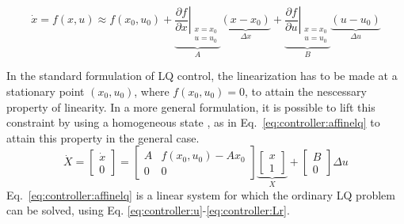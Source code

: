     \begin{equation}
        \label{eq:controller:gainscheduling:xdot}
        \dot{x} = f(x,u) \approx f(x_{0},u_{0})
            + \underbrace{\left. \frac{\partial f}{\partial x} \right|_{
                \begin{array}{l}
                    x=x_{0} \\
                    u=u_{0}
                \end{array}
            }}_{A}
                \underbrace{\left( x-x_{0} \right)}_{\Delta x}
            + \underbrace{\left. \frac{\partial f}{\partial u} \right|_{
                \begin{array}{l}
                    x=x_{0} \\
                    u=u_{0}
                \end{array}
            }}_{B}
                \underbrace{\left( u-u_{0} \right)}_{\Delta u}
    \end{equation}

    In the standard formulation of LQ control, the linearization has to be made
    at a stationary point $(x_{0},u_{0})$, where $f(x_{0},u_{0}) = 0$, to
    attain the nescessary property of linearity.
    In a more general formulation, it is possible to lift this constraint by
    using a homogeneous state \citep{Rantzer99piecewiselinear}, as in Eq.~\ref{eq:controller:affinelq}
    to attain this property in the general case.
    \begin{equation}
    \label{eq:controller:affinelq}
        \dot{X} = \left[
        \begin{array}{c}
            \dot{x} \\
            0
        \end{array}\right] =
        \left[
        \begin{array}{cc}
            A & f(x_{0},u_{0})-Ax_{0} \\
            0 & 0
        \end{array}\right]
        \underbrace{\left[
        \begin{array}{c}
            x \\
            1
        \end{array}\right]}_{X}
        +
        \left[
        \begin{array}{c}
            B \\
            0
        \end{array}\right]
        \Delta u
    \end{equation}
    Eq.~\ref{eq:controller:affinelq} is a linear system for which
    the ordinary LQ problem can be solved, using Eq.
    \eqref{eq:controller:u}-\eqref{eq:controller:Lr}.

